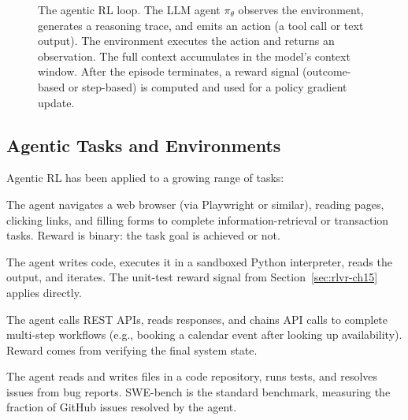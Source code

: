 \begin{figure}[ht]
\caption{The agentic RL loop. The LLM agent $\pi_\theta$ observes the
  environment, generates a reasoning trace, and emits an action (a
  tool call or text output). The environment executes the action and
  returns an observation. The full context accumulates in the model's
  context window. After the episode terminates, a reward signal
  (outcome-based or step-based) is computed and used for a policy
  gradient update.}
\label{fig:agent-loop}
\end{figure}

\subsection{Agentic Tasks and Environments}
\label{subsec:agentic-tasks}

Agentic RL has been applied to a growing range of tasks:

\begin{description}[leftmargin=!,labelwidth=3.5cm]
\item[Web browsing] The agent navigates a web browser (via Playwright
  or similar), reading pages, clicking links, and filling forms to
  complete information-retrieval or transaction tasks. Reward is
  binary: the task goal is achieved or not.

\item[Code execution] The agent writes code, executes it in a
  sandboxed Python interpreter, reads the output, and iterates. The
  unit-test reward signal from Section~\ref{sec:rlvr-ch15} applies
  directly.

\item[API interaction] The agent calls REST APIs, reads responses,
  and chains API calls to complete multi-step workflows (e.g., booking
  a calendar event after looking up availability). Reward comes from
  verifying the final system state.

\item[Repository-level coding] The agent reads and writes files in a
  code repository, runs tests, and resolves issues from bug reports.
  SWE-bench is the standard benchmark, measuring
  the fraction of GitHub issues resolved by the agent.
\end{description}

